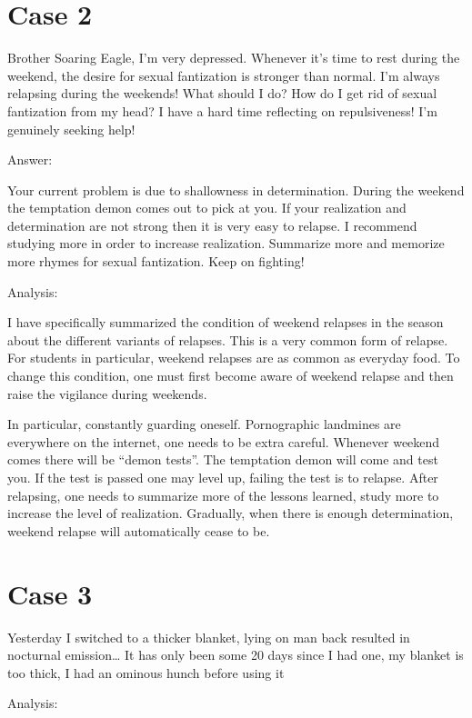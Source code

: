 \documentclass[
]{book}
\begin{document}
\hypertarget{case-2}{%
\section{Case 2}\label{case-2}}

Brother Soaring Eagle, I'm very depressed. Whenever it's time to rest during the weekend, the desire for sexual fantization is stronger than normal. I'm always relapsing during the weekends! What should I do? How do I get rid of sexual fantization from my head? I have a hard time reflecting on repulsiveness! I'm genuinely seeking help!

Answer:

Your current problem is due to shallowness in determination. During the weekend the temptation demon comes out to pick at you. If your realization and determination are not strong then it is very easy to relapse. I recommend studying more in order to increase realization. Summarize more and memorize more rhymes for sexual fantization. Keep on fighting!

Analysis:

I have specifically summarized the condition of weekend relapses in the season about the different variants of relapses. This is a very common form of relapse. For students in particular, weekend relapses are as common as everyday food. To change this condition, one must first become aware of weekend relapse and then raise the vigilance during weekends.

In particular, constantly guarding oneself. Pornographic landmines are everywhere on the internet, one needs to be extra careful. Whenever weekend comes there will be ``demon tests''. The temptation demon will come and test you. If the test is passed one may level up, failing the test is to relapse. After relapsing, one needs to summarize more of the lessons learned, study more to increase the level of realization. Gradually, when there is enough determination, weekend relapse will automatically cease to be.

\hypertarget{case-3}{%
\section{Case 3}\label{case-3}}

Yesterday I switched to a thicker blanket, lying on man back resulted in nocturnal emission\ldots{} It has only been some 20 days since I had one, my blanket is too thick, I had an ominous hunch before using it

Analysis:
\end{document}
